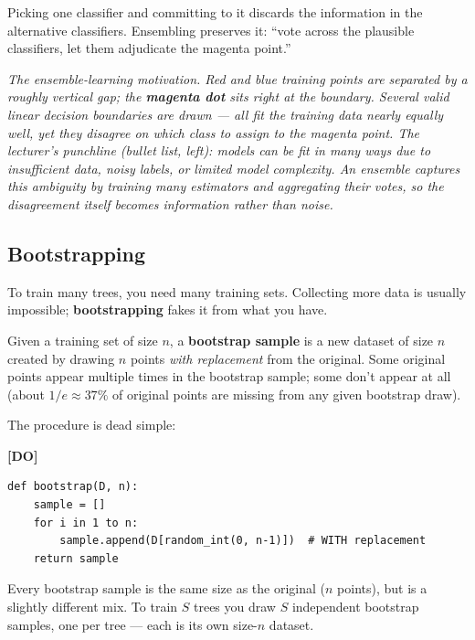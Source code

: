\documentclass[11pt, a4paper]{article}
\newcommand{\doflag}{\textcolor{defBd}{\textbf{[DO]}}\,}
\begin{document}
Picking one classifier and committing to it discards the information in the alternative classifiers. Ensembling preserves it: ``vote across the plausible classifiers, let them adjudicate the magenta point.''

\begin{center}

\footnotesize\textit{The ensemble-learning motivation. Red and blue training points are separated by a roughly vertical gap; the \textbf{magenta dot} sits right at the boundary. Several valid linear decision boundaries are drawn --- all fit the training data nearly equally well, yet they disagree on which class to assign to the magenta point. The lecturer's punchline (bullet list, left): models can be fit in many ways due to insufficient data, noisy labels, or limited model complexity. An ensemble captures this ambiguity by training many estimators and aggregating their votes, so the disagreement itself becomes information rather than noise.}
\end{center}

\subsection{Bootstrapping}

To train many trees, you need many training sets. Collecting more data is usually impossible; \textbf{bootstrapping} fakes it from what you have.

\begin{defbox}
Given a training set of size $n$, a \textbf{bootstrap sample} is a new dataset of size $n$ created by drawing $n$ points \emph{with replacement} from the original. Some original points appear multiple times in the bootstrap sample; some don't appear at all (about $1/e \approx 37\%$ of original points are missing from any given bootstrap draw).
\end{defbox}

The procedure is dead simple:

\doflag{}
\begin{verbatim}
def bootstrap(D, n):
    sample = []
    for i in 1 to n:
        sample.append(D[random_int(0, n-1)])  # WITH replacement
    return sample
\end{verbatim}

Every bootstrap sample is the same size as the original ($n$ points), but is a slightly different mix. To train $S$ trees you draw $S$ independent bootstrap samples, one per tree — each is its own size-$n$ dataset.
\end{document}
